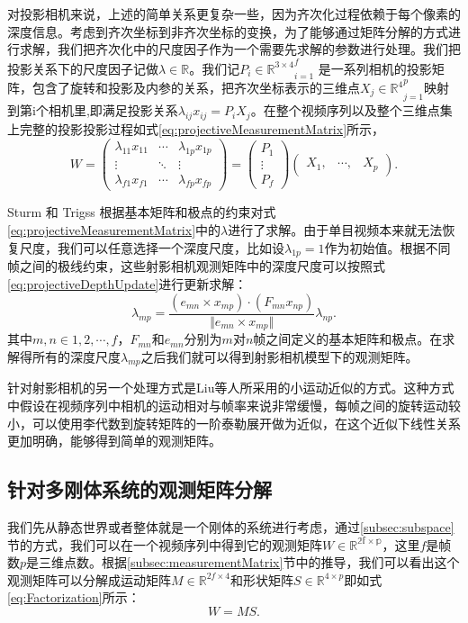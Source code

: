 对投影相机来说，上述的简单关系更复杂一些，因为齐次化过程依赖于每个像素的深度信息\cite{Sturm1996A}。考虑到齐次坐标到非齐次坐标的变换，为了能够通过矩阵分解的方式进行求解，我们把齐次化中的尺度因子作为一个需要先求解的参数进行处理。我们把投影关系下的尺度因子记做$\lambda\in \mathbb{R}$。我们记${P_i\in \mathbb{R}^{3\times4}}_{i=1}^f$ 是一系列相机的投影矩阵，包含了旋转和投影及内参的关系，把齐次坐标表示的三维点${X_j\in \mathbb{R}^4}_{j=1}^p$映射到第i个相机里,即满足投影关系$\lambda_{ij}x_{ij}=P_i X_j$。在整个视频序列以及整个三维点集上完整的投影投影过程如式\eqref{eq:projectiveMeasurementMatrix}所示，
\begin{equation}\label{eq:projectiveMeasurementMatrix}
W=
\begin{pmatrix}
\lambda_{11}x_{11}&\cdots&\lambda_{1p}x_{1p}\\
\vdots&\ddots & \vdots\\
\lambda_{f1}x_{f1}&\cdots&\lambda_{fp}x_{fp}
\end{pmatrix}
=
\begin{pmatrix}
P_1\\
\vdots\\
P_f
\end{pmatrix}
\begin{pmatrix}
X_1,&\cdots,&X_p
\end{pmatrix}.
\end{equation}

Sturm 和 Trigss\cite{Sturm1996A} 根据基本矩阵和极点的约束对式\eqref{eq:projectiveMeasurementMatrix}中的$\lambda$进行了求解。由于单目视频本来就无法恢复尺度，我们可以任意选择一个深度尺度，比如设$\lambda_{1p}=1$作为初始值。根据不同帧之间的极线约束，这些射影相机观测矩阵中的深度尺度可以按照式\eqref{eq:projectiveDepthUpdate}进行更新求解：
\begin{equation}\label{eq:projectiveDepthUpdate}
\lambda_{mp}=\frac{(e_{mn}\times x_{mp})\cdot(F_{mn}x_{np})}{\Vert e_{mn}\times x_{mp}\Vert}\lambda_{np}.
\end{equation} 
其中$m,n\in{1,2,\cdots,f}$，$F_{mn}$和$e_{mn}$分别为$m$对$n$帧之间定义的基本矩阵和极点。在求解得所有的深度尺度$\lambda_{mp}$之后我们就可以得到射影相机模型下的观测矩阵。

针对射影相机的另一个处理方式是Liu等人\cite{Feng2013Joint}所采用的小运动近似的方式。这种方式中假设在视频序列中相机的运动相对与帧率来说非常缓慢，每帧之间的旋转运动较小，可以使用李代数到旋转矩阵的一阶泰勒展开做为近似，在这个近似下线性关系更加明确，能够得到简单的观测矩阵。
\subsection{针对多刚体系统的观测矩阵分解}
我们先从静态世界或者整体就是一个刚体的系统进行考虑，通过\ref{subsec:subspace}节的方式，我们可以在一个视频序列中得到它的观测矩阵$W\in \mathbb{R^{2f\times p}}$，这里$f$是帧数$p$是三维点数。根据\ref{subsec:measurementMatrix}节中的推导，我们可以看出这个观测矩阵可以分解成运动矩阵$M\in \mathbb{R}^{2f\times 4}$和形状矩阵$S\in\mathbb{R}^{4\times p}$即如式\eqref{eq:Factorization}所示：
\begin{equation}\label{eq:Factorization}
W=M S .
\end{equation}


